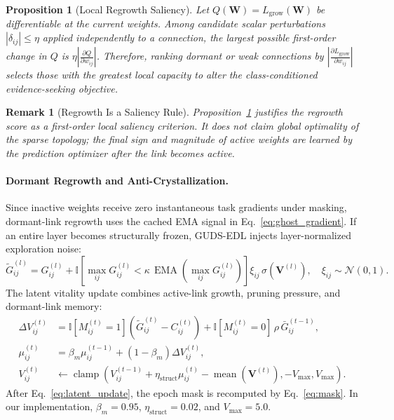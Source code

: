 \documentclass[letterpaper]{article} %
\newtheorem{remark}{Remark}
\newtheorem{proposition}{Proposition}
\begin{document}
\begin{proposition}[Local Regrowth Saliency]
\label{prop:regrowth_saliency}
Let $Q(\bm{W})=L_{\text{grow}}(\bm{W})$ be differentiable at the current weights. Among candidate scalar perturbations $|\delta_{ij}|\le\eta$ applied independently to a connection, the largest possible first-order change in $Q$ is $\eta\left|\frac{\partial Q}{\partial w_{ij}}\right|$. Therefore, ranking dormant or weak connections by $\left|\frac{\partial L_{\text{grow}}}{\partial w_{ij}}\right|$ selects those with the greatest local capacity to alter the class-conditioned evidence-seeking objective.
\end{proposition}

\begin{remark}[Regrowth Is a Saliency Rule]
Proposition~\ref{prop:regrowth_saliency} justifies the regrowth score as a first-order local saliency criterion. It does not claim global optimality of the sparse topology; the final sign and magnitude of active weights are learned by the prediction optimizer after the link becomes active.
\end{remark}

\paragraph{Dormant Regrowth and Anti-Crystallization.}
Since inactive weights receive zero instantaneous task gradients under masking, dormant-link regrowth uses the cached EMA signal in Eq.~\ref{eq:ghost_gradient}. If an entire layer becomes structurally frozen, GUDS-EDL injects layer-normalized exploration noise:
\begin{equation}\label{eq:anti_crystal}
    \tilde{G}_{ij}^{(l)}
    = G_{ij}^{(l)}
    + \mathbb{I}\!\left[
    \max_{ij}G_{ij}^{(l)}
    < \kappa\,\operatorname{EMA}\!\left(\max_{ij}G_{ij}^{(l)}\right)
    \right]\xi_{ij}\,\sigma(\bm{V}^{(l)}),
    \quad \xi_{ij}\sim\mathcal{N}(0,1).
\end{equation}
The latent vitality update combines active-link growth, pruning pressure, and dormant-link memory:
\begin{equation}\label{eq:latent_update}
\begin{aligned}
    \Delta V_{ij}^{(t)}
    &= \mathbb{I}[M_{ij}^{(t)}=1]\left(\tilde{G}_{ij}^{(t)}-C_{ij}^{(t)}\right)
    + \mathbb{I}[M_{ij}^{(t)}=0]\,\rho\,\bar{G}_{ij}^{(t-1)},\\
    \mu_{ij}^{(t)}
    &= \beta_m \mu_{ij}^{(t-1)} + (1-\beta_m)\Delta V_{ij}^{(t)},\\
    V_{ij}^{(t)}
    &\leftarrow
    \operatorname{clamp}\!\left(
    V_{ij}^{(t-1)}+\eta_{\text{struct}}\mu_{ij}^{(t)}
    - \operatorname{mean}(\bm{V}^{(t)}),
    -V_{\max}, V_{\max}
    \right).
\end{aligned}
\end{equation}
After Eq.~\ref{eq:latent_update}, the epoch mask is recomputed by Eq.~\ref{eq:mask}. In our implementation, $\beta_m=0.95$, $\eta_{\text{struct}}=0.02$, and $V_{\max}=5.0$.
\end{document}
